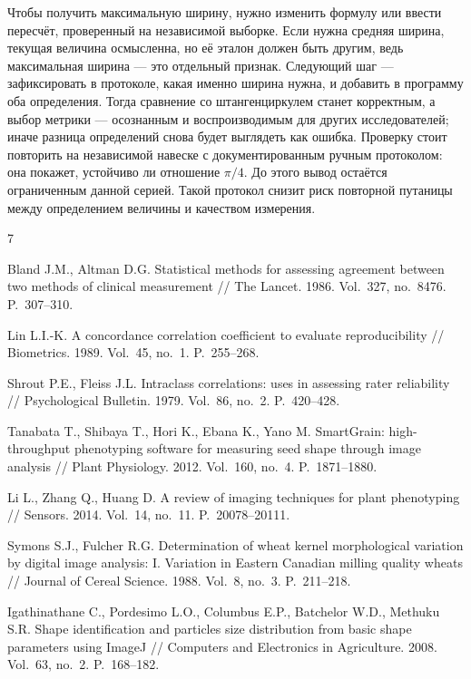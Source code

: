 \documentclass[12pt,a4paper]{article}
\begin{document}
Чтобы получить максимальную ширину, нужно изменить формулу или ввести
пересчёт, проверенный на независимой выборке. Если нужна средняя ширина,
текущая величина осмысленна, но её эталон должен быть другим, ведь
максимальная ширина --- это отдельный признак. Следующий шаг ---
зафиксировать в протоколе, какая именно ширина нужна, и добавить в программу
оба определения. Тогда сравнение со штангенциркулем станет корректным, а
выбор метрики --- осознанным и воспроизводимым для других исследователей;
иначе разница определений снова будет выглядеть как ошибка. Проверку стоит повторить на независимой навеске с
документированным ручным протоколом: она покажет, устойчиво ли отношение
$\pi/4$. До этого вывод остаётся ограниченным данной серией. Такой протокол
снизит риск повторной путаницы между определением величины и качеством
измерения.

\renewcommand{\refname}{Список литературы}
{\small
{}
\begin{thebibliography}{7}
\setlength{\itemsep}{0pt}

Bland J.M., Altman D.G. Statistical methods for assessing agreement between
two methods of clinical measurement // The Lancet. 1986. Vol.~327, no.~8476.
P.~307--310.

Lin L.I.-K. A concordance correlation coefficient to evaluate
reproducibility // Biometrics. 1989. Vol.~45, no.~1. P.~255--268.

Shrout P.E., Fleiss J.L. Intraclass correlations: uses in assessing rater
reliability // Psychological Bulletin. 1979. Vol.~86, no.~2. P.~420--428.

Tanabata T., Shibaya T., Hori K., Ebana K., Yano M. SmartGrain:
high-throughput phenotyping software for measuring seed shape through image
analysis // Plant Physiology. 2012. Vol.~160, no.~4. P.~1871--1880.

Li L., Zhang Q., Huang D. A review of imaging techniques for plant
phenotyping // Sensors. 2014. Vol.~14, no.~11. P.~20078--20111.

Symons S.J., Fulcher R.G. Determination of wheat kernel morphological
variation by digital image analysis: I. Variation in Eastern Canadian
milling quality wheats // Journal of Cereal Science. 1988. Vol.~8, no.~3.
P.~211--218.

Igathinathane C., Pordesimo L.O., Columbus E.P., Batchelor W.D.,
Methuku S.R. Shape identification and particles size distribution from
basic shape parameters using ImageJ // Computers and Electronics in
Agriculture. 2008. Vol.~63, no.~2. P.~168--182.

\end{thebibliography}
}
\end{document}
